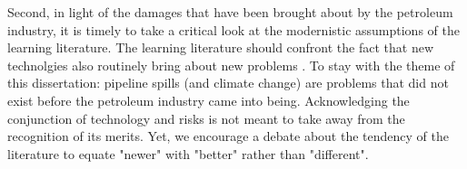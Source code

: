 Second, in light of the damages that have been brought about by the petroleum industry, it is  timely to take a critical look at the modernistic assumptions of the learning literature. The learning literature should confront the fact that new technolgies also routinely bring about new problems \citep{Beck1992}. To stay with the theme of this dissertation: pipeline spills (and climate change) are problems that did not exist before the petroleum industry came into being. Acknowledging the conjunction of technology and risks is not meant to take away from the recognition of its merits. Yet, we encourage a debate about the tendency of the literature to equate "newer" with "better" rather than "different".

